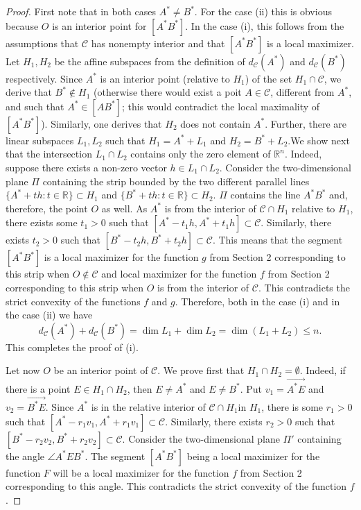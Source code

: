 \documentclass[a4paper,12pt]{amsart}
\begin{document}
\begin{proof}
First note that in both cases $A^* \not = B^*$. For the case (ii) this is obvious because $O$ is an interior point for
$[A^*B^*]$. In the case (i), this follows from the assumptions that $\mathcal C$ has nonempty interior and that $[A^*B^*]$ is a local maximizer.
Let $H_1, H_2$ be the affine subspaces from
the definition of $d_{\mathcal C}(A^*)$ and $d_{\mathcal C}(B^*)$ respectively.
Since $A^*$ is an interior point (relative to $H_1$) of the set $H_1 \cap \mathcal C$,
we derive that $B^* \not \in  H_1$ (otherwise there would exist a poit $A \in \mathcal C$, different from
$A^* $, and such that $A^* \in [AB^*]$; this would contradict the local maximality of
$[A^*B^*]$).
Similarly, one derives that  $H_2$ does not contain $A^*$.
Further, there are linear
 subspaces $L_1, L_2$ such that $H_1 = A^* +L_1$ and $H_2 = B^* +L_2$.We show next that the
intersection $L_1 \cap L_2$ contains only the zero element of $\mathbb R^n$. Indeed, suppose
there exists a non-zero vector $h \in L_1 \cap L_2$.
Consider the two-dimensional plane
$\Pi$ containing the strip bounded by the two different parallel lines
$\{A^* + th : t\in \mathbb R\} \subset H_1$  and
$\{B^* + th : t\in \mathbb R\} \subset H_2 $.
$\Pi$ contains the line $A^*B^*$ and, therefore, the point $O$ as well.
As $A^*$ is from the interior of $\mathcal C \cap H_1$ relative to $H_1$,
there ezists some $t_1>0$ such that $[A^* - t_1h, A^* + t_1h] \subset \mathcal C$. Similarly, there exists $t_2 >0$ such that  $[B^* - t_2h, B^* + t_2h] \subset \mathcal C$.
This means that the segment
$[A^*B^*]$ is a local maximizer for the function $g$ from Section 2 corresponding to this strip when $O \not \in \mathcal C$ and local maximizer for the function $f$ from Section 2 corresponding to this strip when
$O$ is from the interior of $\mathcal C$.
This contradicts the strict convexity of the functions $f$ and $g$.
 Therefore, both in the case (i) and in the case (ii) we have
$$d_{\mathcal C}(A^*) + d_{\mathcal C}(B^*) = \dim L_1 + \dim L_2 = \dim(L_1 + L_2) \leq n.$$ This completes the proof of (i).

Let now $O$ be an interior point of $ \mathcal C$. We prove first that $H_1 \cap H_2 = \emptyset$. Indeed, if there is a point $E \in H_1 \cap H_2$, then $E\not = A^*$ and $E \not= B^*$. Put $v_1= \overrightarrow{A^*E}$ and
$v_2 = \overrightarrow{B^*E}$. Since $A^*$ is in the relative interior of
$\mathcal C \cap H_1$in $H_1$, there is some $r_1>0$ such that
$[A^* - r_1v_1, A^* + r_1v_1] \subset \mathcal C$.
Similarly, there exists $r_2 >0$ such that
$[B^* - r_2v_2, B^* + r_2v_2] \subset \mathcal C$.
 Consider the two-dimensional plane $\Pi'$ containing the angle $\angle A^*EB^*$. The segment $[A^*B^*]$ being a local maximizer for the function $F$ will be a local maximizer for the function $f$ from Section 2 corresponding to this angle. This contradicts the strict convexity of the function $f$.


\end{proof}
\end{document}
